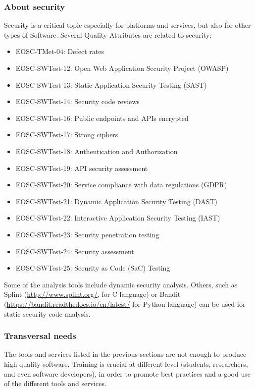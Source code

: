 \subsubsection{About security}

Security is a critical topic especially for platforms and services, but also for other types of Software. Several Quality Attributes are related to security:

\begin{itemize}
  \item EOSC-TMet-04: Defect rates
  \item EOSC-SWTest-12: Open Web Application Security Project (OWASP)
  \item EOSC-SWTest-13: Static Application Security Testing (SAST)
  \item EOSC-SWTest-14: Security code reviews
  \item EOSC-SWTest-16: Public endpoints and APIs encrypted
  \item EOSC-SWTest-17: Strong ciphers
  \item EOSC-SWTest-18: Authentication and Authorization
  \item EOSC-SWTest-19: API security assessment
  \item EOSC-SWTest-20: Service compliance with data regulations (GDPR)
  \item EOSC-SWTest-21: Dynamic Application Security Testing (DAST)
  \item EOSC-SWTest-22: Interactive Application Security Testing (IAST)
  \item EOSC-SWTest-23: Security penetration testing
  \item EOSC-SWTest-24: Security assessment
  \item EOSC-SWTest-25: Security as Code (SaC) Testing
\end{itemize}

Some of the analysis tools include dynamic security analysis. Others, such as Splint (\url{http://www.splint.org/}, for C language) or  Bandit (\url{https://bandit.readthedocs.io/en/latest/} for Python language) can be used for static security code analysis.

\subsubsection{Transversal needs}

The tools and services listed in the previous sections are not enough to produce high quality software. Training is crucial at different level (students, researchers, and even software developers), in order to promote best practices and a good use of the different tools and services.

